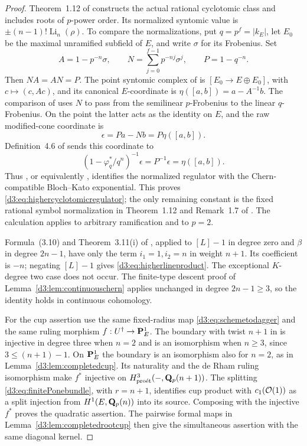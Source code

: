 \begin{proof}
Theorem~1.12 of \cite{BesserDeJeu} constructs the actual rational
cyclotomic class and includes roots of $p$-power order.
Its normalized syntomic value is
$\pm(n-1)!\operatorname{Li}_n(\rho)$.
To compare the normalizations, put $q=p^f=|k_E|$, let $E_0$ be the
maximal unramified subfield of $E$, and write $\sigma$ for its Frobenius.
Set
\[
 A=1-p^{-n}\sigma,\qquad
 N=\sum_{j=0}^{f-1}p^{-nj}\sigma^j,\qquad P=1-q^{-n}.
\]
Then $NA=AN=P$.  The point syntomic complex of
\cite[Example~2.2.4]{HuberKings} is
$[E_0\longrightarrow E\oplus E_0]$, with
$c\mapsto(c,Ac)$, and its canonical $E$-coordinate is
$\eta([a,b])=a-A^{-1}b$.
The comparison of \cite[Proposition~8.6(2)--(3), its proof and equation~(8.1)]{BesserRegulators}
uses $N$ to pass from the semilinear $p$-Frobenius to the linear
$q$-Frobenius.  On the point the latter acts as the identity on $E$,
and the raw modified-cone coordinate is
\[
 \epsilon=Pa-Nb=P\eta([a,b]).
\]
Definition~4.6 of \cite{BesserDeJeu} sends this coordinate to
\begin{equation}\label{d3:eq:pointnormalization}
 (1-\varphi_q^*/q^n)^{-1}\epsilon
   =P^{-1}\epsilon=\eta([a,b]).
\end{equation}
Thus \cite[Corollary~9.10 and Proposition~9.11]{BesserRegulators},
or equivalently \cite[Proposition~2.3.4]{HuberKings}, identifies the
normalized regulator with the Chern-compatible Bloch--Kato
exponential.  This proves \eqref{d3:eq:highercyclotomicregulator};
the only remaining constant is the fixed rational symbol normalization
in Theorem~1.12 and Remark~1.7 of \cite{BesserDeJeu}.
The calculation applies to arbitrary ramification and to $p=2$.

Formula~(3.10) and Theorem~3.11(i) of \cite{WeibelChern}, applied
to $[L]-1$ in degree zero and $\beta$ in degree $2n-1$, have only
the term $i_1=1,i_2=n$ in weight $n+1$.
Its coefficient is $-n$; negating $[L]-1$ gives
\eqref{d3:eq:higherlineproduct}. The exceptional $K$-degree two
case does not occur. The finite-type descent proof of
Lemma~\ref{d3:lem:continuouschern} applies unchanged in degree
$2n-1\geq3$, so the identity holds in continuous cohomology.

For the cup assertion use the same fixed-radius map
\eqref{d3:eq:schemetodagger} and the same ruling morphism
$f:U^\dagger\to\mathbf P^1_E$. The boundary with twist $n+1$ in
\cite[Theorem~1.3]{ColmezNiziol} is injective in degree three
when $n=2$ and is an isomorphism when $n\geq3$, since
$3\leq(n+1)-1$. On $\mathbf P^1_E$ the boundary is an isomorphism
also for $n=2$, as in Lemma~\ref{d3:lem:completedcup}.
Its naturality and the de Rham ruling isomorphism make
$f^*$ injective on $H^3_{\mathrm{pro\acute et}}(-,\mathbf Q_p(n+1))$.
The splitting \eqref{d3:eq:finitePonebundle}, with $r=n+1$,
identifies cup product with $c_1(\mathcal O(1))$ as a split injection
from $H^1(E,\mathbf Q_p(n))$ into its source.
Composing with the injective $f^*$ proves the quadratic assertion.
The pairwise formal maps in Lemma~\ref{d3:lem:completedrootcup}
then give the simultaneous assertion with the same diagonal kernel.
\end{proof}

